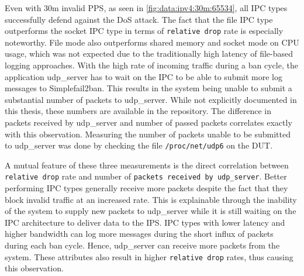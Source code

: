 Even with 30m invalid \ac{PPS}, as seen in \ref{fig:data:ipv4:30m:65534}, all \ac{IPC} types successfully defend against the \ac{DoS} attack.
The fact that the file \ac{IPC} type outperforms the socket \ac{IPC} type in terms of \texttt{relative drop} rate is especially noteworthy.
File mode also outperforms shared memory and socket mode on \ac{CPU} usage, which was not expected due to the traditionally high latency of file-based logging approaches.
With the high rate of incoming traffic during a ban cycle, the application udp\_server has to wait on the \ac{IPC} to be able to submit more log messages to Simplefail2ban.
This results in the system being unable to submit a substantial number of packets to udp\_server.
While not explicitly documented in this thesis, these numbers are available in the repository\cite{git:repoOfThesis}.
The difference in packets received by udp\_server and number of passed packets correlates exactly with this observation.
Measuring the number of packets unable to be submitted to udp\_server was done by checking the file \texttt{/proc/net/udp6} on the \ac{DUT}.

A mutual feature of these three measurements is the direct correlation between \texttt{relative drop} rate and number of \texttt{packets received by udp\_server}.
Better performing \ac{IPC} types generally receive more packets despite the fact that they block invalid traffic at an increased rate.
This is explainable through the inability of the system to supply new packets to udp\_server while it is still waiting on the \ac{IPC} architecture to deliver data to the \ac{IPS}.
\ac{IPC} types with lower latency and higher bandwidth can log more messages during the short influx of packets during each ban cycle.
Hence, udp\_server can receive more packets from the system.
These attributes also result in higher \texttt{relative drop} rates, thus causing this observation.

